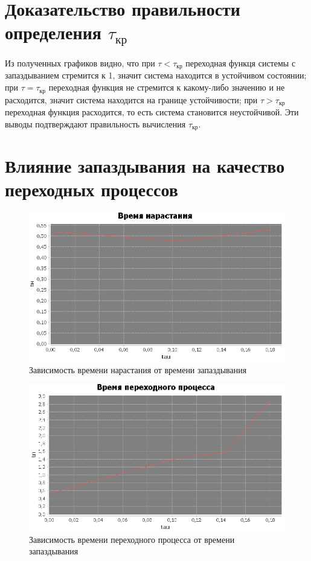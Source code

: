 \documentclass[12pt]{article}
\begin{document}
\section{Доказательство правильности определения $\tau_{кр}$}
Из полученных графиков видно, что при $\tau < \tau_{кр}$ переходная функця системы с запаздыванием стремится к 1, значит система находится в устойчивом состоянии; при $\tau = \tau_{кр}$ переходная функция не стремится к какому-либо значению и не расходится, значит система находится на границе устойчивости; при $\tau > \tau_{кр}$ переходная функция расходится, то есть система становится неустойчивой. Эти выводы подтверждают правильность вычисления $\tau_{кр}$. 
\newpage
\section{Влияние запаздывания на качество переходных процессов}
\begin{figure}[h!]
     \centering
    \includegraphics[width = \linewidth]{время нарастания.png}
    \caption{Зависимость времени нарастания от времени запаздывания}
\end{figure} 
\begin{figure}[h!]
     \centering
    \includegraphics[width = \linewidth]{время переходного процесса.png}
    \caption{Зависимость времени переходного процесса от времени запаздывания}
\end{figure} 
\end{document}
